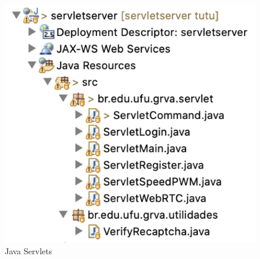 \begin{figure}[!hbt]
\begin{center}
\includegraphics[width=0.4\linewidth]{img/cap5/servlets01}
\caption{Java Servlets} \label{fig:servlets01}
\end{center}
\end{figure}

